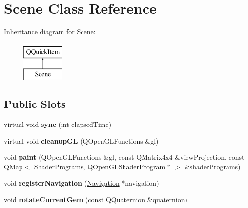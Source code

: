 \hypertarget{class_scene}{}\section{Scene Class Reference}
\label{class_scene}
Inheritance diagram for Scene\+:\begin{figure}[H]
\begin{center}
\leavevmode
\includegraphics[height=2.000000cm]{class_scene}
\end{center}
\end{figure}
\subsection*{Public Slots}
\begin{DoxyCompactItemize}
\item 
\hypertarget{class_scene_affe50b48f645e09b22f6f8c5c0561654}{}virtual void {\bfseries sync} (int elapsed\+Time)\label{class_scene_affe50b48f645e09b22f6f8c5c0561654}

\item 
\hypertarget{class_scene_abc75a5de4f5a191816e6e1901b7b62bf}{}virtual void {\bfseries cleanup\+G\+L} (Q\+Open\+G\+L\+Functions \&gl)\label{class_scene_abc75a5de4f5a191816e6e1901b7b62bf}

\item 
\hypertarget{class_scene_a0d27204bee9a3211c83bc81f592b5c3c}{}void {\bfseries paint} (Q\+Open\+G\+L\+Functions \&gl, const Q\+Matrix4x4 \&view\+Projection, const Q\+Map$<$ Shader\+Programs, Q\+Open\+G\+L\+Shader\+Program $\ast$ $>$ \&shader\+Programs)\label{class_scene_a0d27204bee9a3211c83bc81f592b5c3c}

\item 
\hypertarget{class_scene_ace3407a4d148d317a20b1bf205554bc5}{}void {\bfseries register\+Navigation} (\hyperlink{class_navigation}{Navigation} $\ast$navigation)\label{class_scene_ace3407a4d148d317a20b1bf205554bc5}

\item 
\hypertarget{class_scene_ade6d7968a2bad7c1dfbae98045a8aa7d}{}void {\bfseries rotate\+Current\+Gem} (const Q\+Quaternion \&quaternion)\label{class_scene_ade6d7968a2bad7c1dfbae98045a8aa7d}

\end{DoxyCompactItemize}
